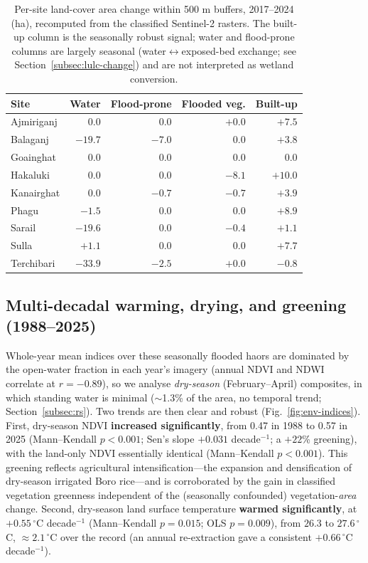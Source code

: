 \documentclass[preprint,authoryear,12pt]{elsarticle}
\begin{document}
\begin{table}[htbp]\centering
\caption{Per-site land-cover area change within 500 m buffers, 2017--2024 (ha), recomputed
from the classified Sentinel-2 rasters. The built-up column is the seasonally robust signal;
water and flood-prone columns are largely seasonal (water$\leftrightarrow$exposed-bed exchange;
see Section~\ref{subsec:lulc-change}) and are not interpreted as wetland conversion.}
\label{tab:buffer}
\begin{tabular}{lrrrr}
\hline
Site & Water & Flood-prone & Flooded veg. & Built-up \\
\hline
Ajmiriganj & $0.0$ & $0.0$ & $+0.0$ & $+7.5$ \\
Balaganj & $-19.7$ & $-7.0$ & $0.0$ & $+3.8$ \\
Goainghat & $0.0$ & $0.0$ & $0.0$ & $0.0$ \\
Hakaluki & $0.0$ & $0.0$ & $-8.1$ & $+10.0$ \\
Kanairghat & $0.0$ & $-0.7$ & $-0.7$ & $+3.9$ \\
Phagu & $-1.5$ & $0.0$ & $0.0$ & $+8.9$ \\
Sarail & $-19.6$ & $0.0$ & $-0.4$ & $+1.1$ \\
Sulla & $+1.1$ & $0.0$ & $0.0$ & $+7.7$ \\
Terchibari & $-33.9$ & $-2.5$ & $+0.0$ & $-0.8$ \\
\hline
\end{tabular}
\end{table}

\subsection{Multi-decadal warming, drying, and greening (1988--2025)}
\label{subsec:indices}
Whole-year mean indices over these seasonally flooded haors are dominated by the open-water
fraction in each year's imagery (annual NDVI and NDWI correlate at $r=-0.89$), so we analyse
\emph{dry-season} (February--April) composites, in which standing water is minimal ($\sim$1.3\%
of the area, no temporal trend; Section~\ref{subsec:rs}). Two trends are then clear and robust
(Fig.~\ref{fig:env-indices}). First, dry-season NDVI \textbf{increased significantly}, from 0.47
in 1988 to 0.57 in 2025 (Mann--Kendall $p<0.001$; Sen's slope $+0.031$ decade$^{-1}$; a $+22$\%
greening), with the land-only NDVI essentially identical (Mann--Kendall $p<0.001$). This greening
reflects agricultural intensification---the expansion and densification of dry-season irrigated
Boro rice---and is corroborated by the gain in classified vegetation greenness independent of the
(seasonally confounded) vegetation-\emph{area} change. Second, dry-season land surface temperature
\textbf{warmed significantly}, at $+0.55\,^{\circ}$C decade$^{-1}$ (Mann--Kendall $p=0.015$; OLS
$p=0.009$), from $26.3$ to $27.6\,^{\circ}$C, $\approx$$2.1\,^{\circ}$C over the record (an annual
re-extraction gave a consistent $+0.66\,^{\circ}$C decade$^{-1}$).
\end{document}
